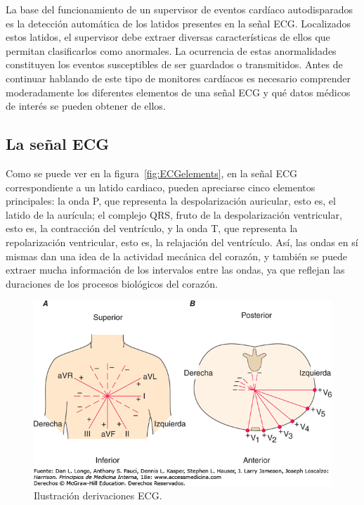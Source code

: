 La base del funcionamiento de un supervisor de eventos cardíaco autodisparados es la detección automática de los latidos presentes en la señal ECG.\cite{Satija} Localizados estos latidos, el supervisor debe extraer diversas características de ellos que permitan clasificarlos como anormales. La ocurrencia de estas anormalidades constituyen los eventos susceptibles de ser guardados o transmitidos.  Antes de continuar hablando de este tipo de monitores cardíacos es necesario comprender moderadamente los diferentes elementos de una señal ECG y qué datos médicos de interés se pueden obtener de ellos. 

\subsection{La señal ECG}

Como se puede ver en la figura~\ref{fig:ECGelements}, en la señal ECG correspondiente a un latido cardiaco, pueden apreciarse cinco elementos principales: la onda P, que representa la despolarización auricular, esto es, el latido de la aurícula; el complejo QRS, fruto de la despolarización ventricular, esto es, la contracción del ventrículo, y la onda T, que representa la repolarización ventricular, esto es, la relajación del ventrículo. Así, las ondas en sí mismas dan una idea de la actividad mecánica del corazón, y también se puede extraer mucha información de los intervalos entre las ondas, ya que reflejan las duraciones de los procesos biológicos del corazón.

\begin{figure}[ht]
	\centering
		\includegraphics[width=0.9\linewidth]{figuras/derivations.png}
	\caption{Ilustración derivaciones ECG.\cite{Harrison}}
	\label{fig:derivaciones}
\end{figure} 

